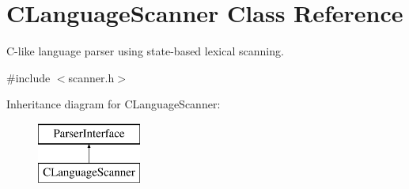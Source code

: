 \hypertarget{class_c_language_scanner}{}\section{C\+Language\+Scanner Class Reference}
\label{class_c_language_scanner}


C-\/like language parser using state-\/based lexical scanning.  




{\ttfamily \#include $<$scanner.\+h$>$}

Inheritance diagram for C\+Language\+Scanner\+:\begin{figure}[H]
\begin{center}
\leavevmode
\includegraphics[height=2.000000cm]{class_c_language_scanner}
\end{center}
\end{figure}
